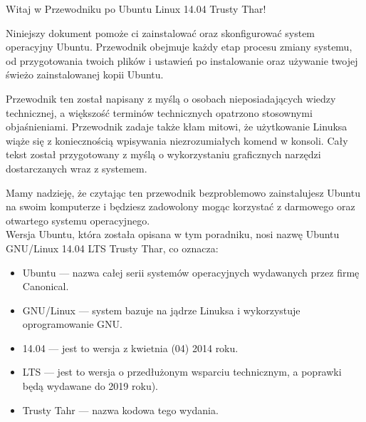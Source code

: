 \noindent Witaj w \textcolor{ubuntu_orange}{Przewodniku po Ubuntu Linux 14.04 Trusty Thar!}

Niniejszy dokument pomoże ci zainstalować oraz skonfigurować system operacyjny Ubuntu. Przewodnik obejmuje każdy etap procesu zmiany systemu, od przygotowania twoich plików i ustawień po instalowanie oraz używanie twojej świeżo zainstalowanej kopii Ubuntu.

Przewodnik ten został napisany z myślą o osobach nieposiadających wiedzy technicznej, a większość terminów technicznych opatrzono stosownymi objaśnieniami. Przewodnik zadaje także kłam mitowi, że użytkowanie Linuksa wiąże się z koniecznością wpisywania niezrozumiałych komend w konsoli. Cały tekst został przygotowany z myślą o wykorzystaniu graficznych narzędzi dostarczanych wraz z systemem.

Mamy nadzieję, że czytając ten przewodnik bezproblemowo zainstalujesz Ubuntu na swoim komputerze i będziesz zadowolony mogąc korzystać z darmowego oraz otwartego systemu operacyjnego.\\
Wersja Ubuntu, która została opisana w tym poradniku, nosi nazwę Ubuntu GNU/Linux 14.04 LTS Trusty Thar, co oznacza:
\begin{itemize}
\item \textcolor{ubuntu_orange}{Ubuntu} ---  nazwa całej serii systemów operacyjnych wydawanych przez firmę Canonical.
\item \textcolor{ubuntu_orange}{GNU/Linux} --- system bazuje na jądrze Linuksa i wykorzystuje oprogramowanie GNU.
\item \textcolor{ubuntu_orange}{14.04} --- jest to wersja z kwietnia (04) 2014 roku.
\item \textcolor{ubuntu_orange}{LTS} --- jest to wersja o przedłużonym wsparciu technicznym, a poprawki będą wydawane do 2019 roku).
\item \textcolor{ubuntu_orange}{Trusty Tahr} --- nazwa kodowa tego wydania.
\end{itemize}